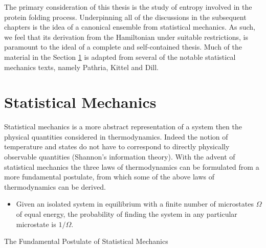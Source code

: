 The primary consideration of this thesis is the study of entropy involved in the protein folding process. Underpinning all of the discussions in the subsequent chapters is the idea of a canonical ensemble from statistical mechanics. As such, we feel that its derivation from the Hamiltonian under suitable restrictions, is paramount to the ideal of a complete and self-contained thesis. Much of the material in the Section \ref{sec:stat_mech_intro} is adapted from several of the notable statistical mechanics texts, namely Pathria,\cite{pathria_statistical_1996} Kittel\cite{kittel_thermal_1980} and Dill.\cite{dill_molecular_2002}

\section{Statistical Mechanics}
\label{sec:stat_mech_intro}

Statistical mechanics is a more abstract representation of a system then the physical quantities considered in thermodynamics. Indeed the notion of temperature and states do not have to correspond to directly physically observable quantities (\cf Shannon's information theory\cite{shannon_mathematical_2001}). With the advent of statistical mechanics the three laws of thermodynamics can be formulated from a more fundamental postulate, from which some of the above laws of thermodynamics can be derived. \newline
\epigraph{
  \begin{itemize}
  \item Given an isolated system in equilibrium with a finite number of microstates $\Omega$ of equal energy, the probability of finding the system in any particular microstate is $1/\Omega$.
  \end{itemize}
}{The Fundamental Postulate of Statistical Mechanics}


